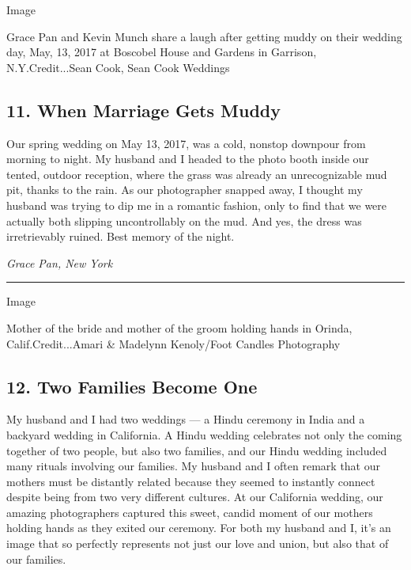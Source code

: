 Image

Grace Pan and Kevin Munch share a laugh after getting muddy on their
wedding day, May, 13, 2017 at Boscobel House and Gardens in Garrison,
N.Y.Credit...Sean Cook, Sean Cook Weddings

\hypertarget{11-when-marriage-gets-muddy}{%
\subsection{11. When Marriage Gets
Muddy}\label{11-when-marriage-gets-muddy}}

Our spring wedding on May 13, 2017, was a cold, nonstop downpour from
morning to night. My husband and I headed to the photo booth inside our
tented, outdoor reception, where the grass was already an unrecognizable
mud pit, thanks to the rain. As our photographer snapped away, I thought
my husband was trying to dip me in a romantic fashion, only to find that
we were actually both slipping uncontrollably on the mud. And yes, the
dress was irretrievably ruined. Best memory of the night.

\emph{Grace Pan, New York}

\begin{center}\rule{0.5\linewidth}{\linethickness}\end{center}

Image

Mother of the bride and mother of the groom holding hands in Orinda,
Calif.Credit...Amari \& Madelynn Kenoly/Foot Candles Photography

\hypertarget{12-two-families-become-one}{%
\subsection{12. Two Families Become
One}\label{12-two-families-become-one}}

My husband and I had two weddings --- a Hindu ceremony in India and a
backyard wedding in California. A Hindu wedding celebrates not only the
coming together of two people, but also two families, and our Hindu
wedding included many rituals involving our families. My husband and I
often remark that our mothers must be distantly related because they
seemed to instantly connect despite being from two very different
cultures. At our California wedding, our amazing photographers captured
this sweet, candid moment of our mothers holding hands as they exited
our ceremony. For both my husband and I, it's an image that so perfectly
represents not just our love and union, but also that of our families.

